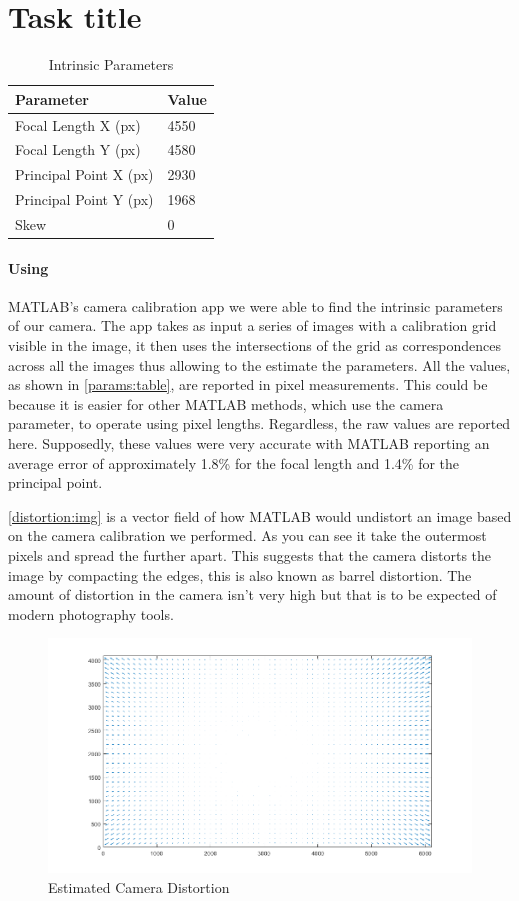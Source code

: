 \section{Task title}

\begin{table}[]
   \centering
   \begin{tabular}{l|l}
   Parameter             & Value \\ \hline
   Focal Length X (px)   & 4550  \\ \hline
   Focal Length Y (px)   & 4580  \\ \hline
   Principal Point X (px) & 2930  \\ \hline
   Principal Point Y (px) & 1968  \\ \hline
   Skew                  & 0    
   \end{tabular}
   \caption{Intrinsic Parameters}
   \label{params:table}
\end{table}

\paragraph{Using} MATLAB's camera calibration app we were able to find the intrinsic parameters of our camera. The app takes as input a series of images with a calibration grid visible in the image, it then uses the intersections of the grid as correspondences across all the images thus allowing to the estimate the parameters. All the values, as shown in \autoref{params:table}, are reported in pixel measurements. This could be because it is easier for other MATLAB methods, which use the camera parameter, to operate using pixel lengths. Regardless, the raw values are reported here. Supposedly, these values were very accurate with MATLAB reporting an average error of approximately 1.8\% for the focal length and 1.4\% for the principal point. 

\autoref{distortion:img} is a vector field of how MATLAB would undistort an image based on the camera calibration we performed. As you can see it take the outermost pixels and spread the further apart. This suggests that the camera distorts the image by compacting the edges, this is also known as barrel distortion. The amount of distortion in the camera isn't very high but that is to be expected of modern photography tools.

\begin{figure}[ht]
   \centering
   \includegraphics[width=0.8\linewidth]{Task3/images/distortion.png}
   \caption{Estimated Camera Distortion}
   \label{distortion:img}
\end{figure}